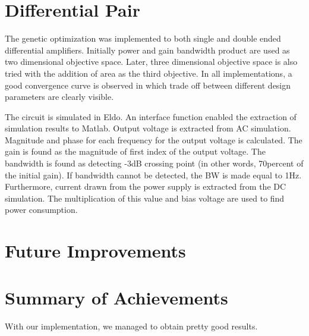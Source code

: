 \section{Differential Pair} 

The genetic optimization was implemented to both single and double ended differential amplifiers. Initially power and gain bandwidth product are used as two dimensional objective space. Later, three dimensional objective space is also tried with the addition of area as the third objective. In all implementations, a good convergence curve is observed in which trade off between different design parameters are clearly visible. 

The circuit is simulated in Eldo. An interface function enabled the extraction of simulation results to Matlab. Output voltage is extracted from AC simulation. Magnitude and phase for each frequency for the output voltage is calculated. The gain is found as the magnitude of first index of the output voltage. The bandwidth is found as detecting -3dB crossing point (in other words, 70percent of the initial gain). If bandwidth cannot be detected, the BW is made equal to 1Hz. Furthermore, current drawn from the power supply is extracted from the DC simulation. The multiplication of this value and bias voltage are used to find power consumption.


\section{Future Improvements}
\section{Summary of  Achievements}\label{summary}

With our implementation, we managed to obtain pretty good results. 
